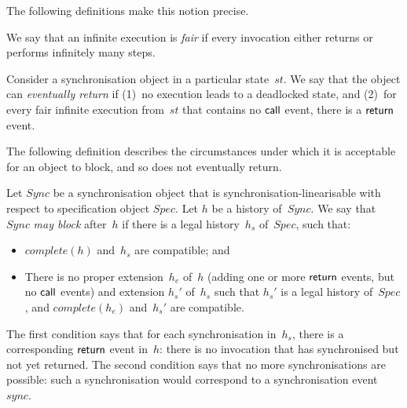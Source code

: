 The following definitions make this notion precise.
%
\begin{definition}
We say that an infinite execution is \emph{fair} if every invocation either
returns or performs infinitely many steps.

Consider a synchronisation object in a particular state~$st$.  We say that the
object can \emph{eventually return} if (1)~no execution leads to a deadlocked
state, and (2)~for every fair infinite execution
from~$st$ that contains no $\mathsf{call}$ event, there is a $\mathsf{return}$ event.
\end{definition}
%






The following definition describes the circumstances under which it is
acceptable for an object to block, and so does not eventually return.
%
\begin{definition}
Let $Sync$ be a synchronisation object that is synchronisation-linearisable
with respect to specification object $Spec$.  Let $h$ be a history of~$Sync$.
We say that $Sync$ \emph{may block} after~$h$ if there is a legal
history~$h_s$ of~$Spec$, such that:
%
\begin{itemize}
\item $complete(h)$ and~$h_s$ are compatible; and

\item There is no proper extension~$h_e$ of~$h$ (adding one or more $\mathsf{return}$
  events, but no $\mathsf{call}$ events) and extension $h_s'$ of~$h_s$ such that
  $h_s'$ is a legal history of~$Spec$, and $complete(h_e)$ and~$h_s'$ are
  compatible.
\end{itemize}
\end{definition}
%
The first condition says that for each synchronisation in~$h_s$,
there is a corresponding $\mathsf{return}$ event in~$h$: there is no invocation that
has synchronised but not yet returned.  The second condition says that no more
synchronisations are possible: such a synchronisation would correspond to a
synchronisation event~$sync$.

